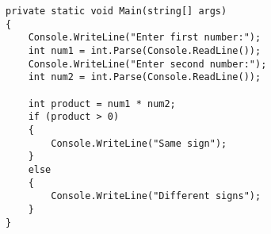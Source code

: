 \documentclass[12pt, twoside]{article}
\begin{document}
\begin{enumerate}[itemsep=3em]
\begin{enumerate}
\ifwithsols
\begin{boxSolution}
\begin{english}
\begin{verbatim}
private static void Main(string[] args)
{
    Console.WriteLine("Enter first number:");
    int num1 = int.Parse(Console.ReadLine());
    Console.WriteLine("Enter second number:");
    int num2 = int.Parse(Console.ReadLine());

    int product = num1 * num2;
    if (product > 0)
    {
        Console.WriteLine("Same sign");
    }
    else
    {
        Console.WriteLine("Different signs");
    }
}
\end{verbatim}
\end{english}
\end{boxSolution}
\clearpage
\fi
\fi




\end{enumerate}
\end{enumerate}
\end{document}
